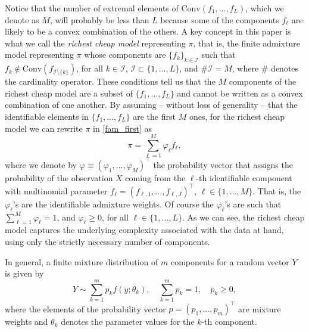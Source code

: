 \documentclass[12pt, reqno]{amsart}
\theoremstyle{definition}
\begin{document}
Notice that the number of extremal elements of $\text{Conv}(f_1,\ldots,f_L)$, which we denote as $M$, will probably be less than $L$ because some of the components $f_\ell$ are likely to be a convex combination of the others. A key concept in this paper is what we call the \textit{richest cheap model} representing $\pi$, that is, the finite admixture model representing $\pi$ whose components are $\{f_k\}_{k \in \mathcal{I}}$ such that $f_k \not\in \text{Conv}(f_{\mathcal{I}\setminus \{k\}})$, for all $k \in \mathcal{I}$, $\mathcal{I} \subset \{1,\ldots,L\}$, and $\#\mathcal{I}=M$, where $\#$ denotes the cardinality operator. These conditions tell us that the $M$ components of the richest cheap model are a subset of $\{f_1,\ldots,f_L\}$ and cannot be written as a convex combination of one another. By assuming -- without loss of generality -- that the identifiable elements in $\{f_1,\ldots,f_L\}$ are the first $M$ ones, for the richest cheap model we can rewrite $\pi$ in \eqref{fam_first} as
\begin{equation}\label{rcm}
    \pi=\sum_{\ell=1}^M \varphi_{\ell} f_\ell,
\end{equation}
where we denote by $\varphi \equiv (\varphi_{1},\ldots,\varphi_{M})^\top$ the probability vector that assigns the probability of the observation $X$ coming from the $\ell$-th identifiable component with multinomial parameter $f_\ell=(f_{\ell,1},\ldots,f_{\ell,J})^\top$, $\ell\in\{1,\ldots,M\}$. That is, the $\varphi_{\ell}$'s are the identifiable admixture weights. Of course the $\varphi_{\ell}$'s are such that $\sum_{\ell=1}^M \varphi_{\ell}=1$, and $\varphi_{\ell} \geq 0$, for all $\ell \in \{1,\ldots,L\}$. As we can see, the richest cheap model captures the underlying complexity associated with the data at hand, using only the strictly necessary number of components.




\iffalse
In general, a finite mixture distribution of $m$ components for a random vector $Y$ is given by
$$Y \sim \sum _{k=1}^m p_k f(y; \theta_k), \quad \sum_{k=1}^m p_k =1, \quad p_k \geq 0,$$
where the elements of the probability vector $p=(p_1,...,p_m)^\top$ are mixture weights and $\theta_k$ denotes the parameter values for the $k$-th component. 
\end{document}
